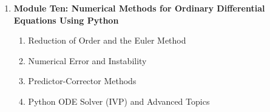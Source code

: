 \begin{enumerate}[label=\arabic*.]
\item {\bf Module Ten: Numerical Methods for Ordinary Differential Equations Using Python}
\begin{enumerate}[label=(\roman*)]
\item Reduction of Order and the Euler Method
\item Numerical Error and Instability
\item Predictor-Corrector Methods
\item Python ODE Solver (IVP) and Advanced Topics
\end{enumerate}
\end{enumerate}

